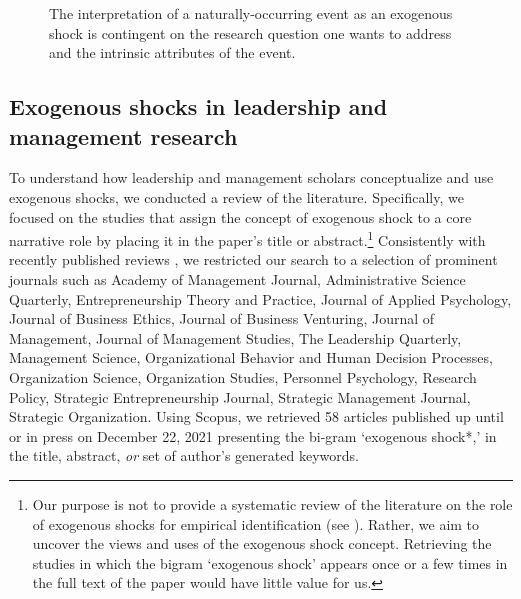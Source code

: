 \documentclass[11pt]{article}
\begin{document}
\begin{refsection}
\begin{figure}
  \caption{The interpretation of a naturally-occurring event as an exogenous 
  shock is contingent on the research question one wants to address and the 
  intrinsic attributes of the event.
  }
  \label{fig:ex_shocks_and_ne}
\end{figure}

\subsection{Exogenous shocks in leadership and management research}
\label{subsec:exogenous_shocks_in_management}

\noindent To understand how leadership and management scholars conceptualize and
use exogenous shocks, we conducted a review of the literature.  Specifically, we
focused on the studies that assign the concept of exogenous shock to a core 
narrative role by placing it in the paper's title or abstract.\footnote{ Our
purpose is not to provide a systematic review of the literature on the role of
exogenous shocks for empirical identification (see \cite{sieweke_santoni_2020}).
Rather, we aim to uncover the views and uses of the exogenous shock concept. 
Retrieving the studies in which the bigram `exogenous shock' appears once or 
a few times in the full text of the paper would have little value for us.}
Consistently with recently published reviews 
\autocite[e.g.,][]{gonzalez_et_al_2018,rindova_et_al_2018}, we restricted our
search to a selection of prominent journals such as Academy of Management
Journal, Administrative Science Quarterly, Entrepreneurship Theory and Practice,
Journal of Applied Psychology, Journal of Business Ethics, Journal of Business
Venturing, Journal of Management, Journal of Management Studies, The Leadership
Quarterly, Management Science, Organizational Behavior and Human Decision
Processes, Organization Science, Organization Studies, Personnel Psychology,
Research Policy, Strategic Entrepreneurship Journal, Strategic Management
Journal, Strategic Organization.  Using Scopus, we retrieved 58 articles
published up until or in press on December 22, 2021 presenting the bi-gram
`exogenous shock*,' in the title, abstract, \emph{or} set of author's generated
keywords.


\end{refsection}
\end{document}
